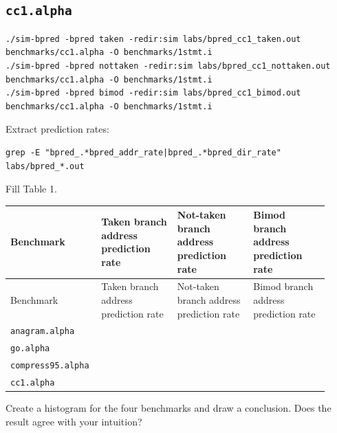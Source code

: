 \documentclass[11pt]{article}
\begin{document}
\subsection{\texttt{cc1.alpha}}
\begin{lstlisting}
./sim-bpred -bpred taken -redir:sim labs/bpred_cc1_taken.out benchmarks/cc1.alpha -O benchmarks/1stmt.i
./sim-bpred -bpred nottaken -redir:sim labs/bpred_cc1_nottaken.out benchmarks/cc1.alpha -O benchmarks/1stmt.i
./sim-bpred -bpred bimod -redir:sim labs/bpred_cc1_bimod.out benchmarks/cc1.alpha -O benchmarks/1stmt.i
\end{lstlisting}
Extract prediction rates:
\begin{lstlisting}
grep -E "bpred_.*bpred_addr_rate|bpred_.*bpred_dir_rate" labs/bpred_*.out
\end{lstlisting}
Fill Table 1.
\begin{center}
\scriptsize
\begin{longtable}{|p{0.23\linewidth}|p{0.23\linewidth}|p{0.23\linewidth}|p{0.23\linewidth}|}
\hline
Benchmark & Taken branch address prediction rate & Not-taken branch address prediction rate & Bimod branch address prediction rate \\
\hline
\endfirsthead
\hline
Benchmark & Taken branch address prediction rate & Not-taken branch address prediction rate & Bimod branch address prediction rate \\
\hline
\endhead
\texttt{anagram.alpha} &  &  &  \\
\hline
\texttt{go.alpha} &  &  &  \\
\hline
\texttt{compress95.alpha} &  &  &  \\
\hline
\texttt{cc1.alpha} &  &  &  \\
\hline
\end{longtable}
\normalsize
\end{center}
Create a histogram for the four benchmarks and draw a conclusion. Does the result agree with your intuition?
\end{document}
